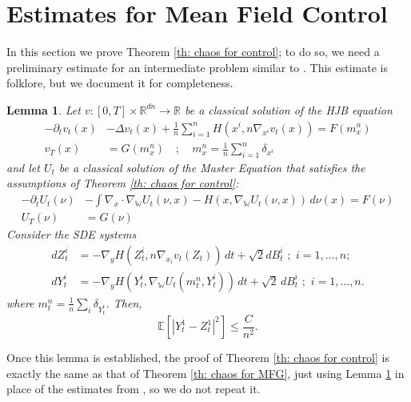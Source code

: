 \documentclass[11pt,reqno]{amsart}
\numberwithin{equation}{section}
\newtheorem{lemma}[theorem]{Lemma}
\theoremstyle{definition}
\def\E{{\mathbb E}}
\def\R{{\mathbb R}}
\newcommand{\wgrad}{\nabla_{\W}}
\newcommand{\W}{\mathbb W}
\begin{document}
\section{Estimates for Mean Field Control}
\label{appendix: control}
In this section we prove Theorem \ref{th: chaos for control}; to do so, we need a preliminary estimate for an intermediate problem similar to \cite[Theorem 2.13]{MasterEquation}. This estimate is folklore, 
but we document it for completeness.
\begin{lemma}
\label{lm: Master equation estimate control}
Let $v:[0,T]\times \R^{dn} \to \R$ be a classical solution of the HJB equation 
\begin{align*}
    -\partial_t v_t(x)&- \Delta v_t(x)+\frac{1}{n}\sum_{i=1}^n H(x^i,n\nabla_{x^i} v_t(x))=F(m_x^n)\\
    v_T(x)&=G(m_x^n)\quad;\quad m_x^n=\frac1n\sum_{i=1}^n \delta_{x^i}
\end{align*}
and let $U_t$ be a classical solution of the Master Equation that satisfies the assumptions of Theorem \ref{th: chaos for control}:
\begin{align*}
    -\partial_t U_t(\nu)&-\int \nabla_x \cdot \wgrad U_t(\nu,x)-H(x,\wgrad U_t(\nu,x))\,d\nu(x)=F(\nu)\\
    U_T(\nu)&=G(\nu)
\end{align*}
    Consider the SDE systems
\begin{align*}
    dZ^i_t&=-\nabla_y H(Z^i_t, n\nabla_{x_i} v_t(Z_t))\,dt+\sqrt 2 dB_t^i\,\,;\,\, i=1,\dots,n;\\
    dY_t^i&=-\nabla_y H(Y_t^i,\wgrad U_t(m_t^n,Y_t^i))\,dt+\sqrt 2 \,dB_t^i\,\,;\,\,i=1,\dots,n.
\end{align*}
where $m_t^n=\frac 1n \sum_{i}\delta_{Y_t^i}$. Then,
\[\E[|Y_t^1-Z_t^1|^2]\leq \frac{C}{n^2}.\]
\end{lemma}

Once this lemma is established, the proof of Theorem \ref{th: chaos for control} is exactly the same as that of Theorem \ref{th: chaos for MFG}, just using Lemma \ref{lm: Master equation estimate control} in place of the estimates from \cite{MasterEquation}, so we do not repeat it.
\end{document}

